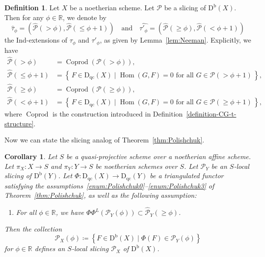 \documentclass[11pt, reqno]{amsart}
\numberwithin{equation}{section}
\theoremstyle{plain}
\newtheorem{corollary}[theorem]{Corollary}
\theoremstyle{remark}
\theoremstyle{definition}
\newtheorem{definition}[theorem]{Definition}
\theoremstyle{italicsname}
\newcommand{\st}{\mid}
\newcommand{\set}[1]{\left\{ \, #1 \, \right\}}
\newcommand{\Db}{\mathrm{D^b}}
\newcommand{\Dqc}{\mathrm{D}_{\mathrm{qc}}}
\DeclareMathOperator{\Coprod}{Coprod}
\DeclareMathOperator{\Hom}{Hom}
\newcommand{\cP}{\mathscr{P}}
\def\RR{\ensuremath{\mathbb{R}}}
\begin{document}
\begin{definition}\label{definition-Ind-slicing}
    Let $X$ be a noetherian scheme. 
    Let $\cP$ be a slicing of $\Db(X)$. 
    Then for any $\phi \in \RR$, we denote by 
    \begin{equation*}
        \widehat{\tau}_{\phi} = (\widehat{\cP}(> \phi), \widehat{\cP}(\leq \phi+1)) \quad \text{and} \quad 
        \widehat{\tau'_{\phi}} = (\widehat{\cP}( \geq \phi), \widehat{\cP}(< \phi +1)) 
    \end{equation*}
    the Ind-extensions of $\tau_{\phi}$ and $\tau'_{\phi}$, as given by Lemma~\ref{lem:Neeman}. 
    Explicitly, we have 
    \begin{align*}
        \widehat{\cP}(> \phi) & = \Coprod(\cP(> \phi)) , \\ 
        \widehat{\cP}(\leq \phi+1) & = \set{F \in \Dqc(X) \st \Hom(G, F) = 0 \text{ for all } G \in \cP(>\phi +1)}, \\ 
        \widehat{\cP}(\geq \phi) & = \Coprod( \cP(\geq \phi)), \\ 
        \widehat{\cP}(< \phi + 1) & = \set{ F \in \Dqc(X) \st \Hom(G, F) = 0 \text{ for all } G \in \cP(\geq \phi + 1)}, 
    \end{align*}
where $\Coprod$ is the construction introduced in Definition~\ref{definition-CG-t-structure}. 
\end{definition}

Now we can state the slicing analog of Theorem~\ref{thm:Polishchuk}. 

\begin{corollary}\label{cor:Polishchuk}
Let $S$ be a quasi-projective scheme over a noetherian affine scheme. 
Let $\pi_X \colon X \to S$ and $\pi_Y \colon Y \to S$ be noetherian schemes over $S$.
Let $\cP_Y$ be an $S$-local slicing of $\Db(Y)$.
Let $\Phi \colon \Dqc(X) \to \Dqc(Y)$ be a triangulated functor satisfying the assumptions~\ref{enum:Polishchuk0}--\ref{enum:Polishchuk3} of Theorem~\ref{thm:Polishchuk}, as well as the following assumption: 
\begin{enumerate}[{\rm (v')}]
    \item \label{enum:PolishchukSlicing} For all $\phi \in \RR$, we have $\Phi\Phi^L(\cP_Y(\phi))\subset\widehat{\cP}_{Y}(\geq\phi)$. 
\end{enumerate}
Then the collection
\begin{equation}\label{eq:PolishchukSlicing2}
\cP_X(\phi)\coloneqq\left\{F\in\Db(X)\st\Phi(F)\in\cP_Y(\phi)\right\}    
\end{equation}
for $\phi\in\RR$ defines an $S$-local slicing $\cP_X$ of $\Db(X)$.
\end{corollary}
\end{document}
